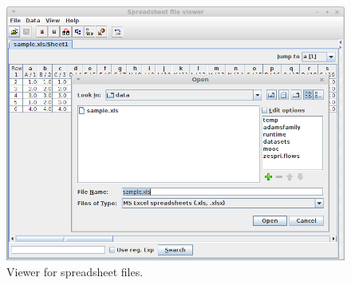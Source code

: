 \documentclass[a4paper]{book}
\begin{document}
\begin{figure}[htb]
  \centering
  \includegraphics[width=12.0cm]{images/spreadsheet-viewer.png}
  \caption{Viewer for spreadsheet files.}
  \label{spreadsheet-viewer}
\end{figure}


\end{document}
